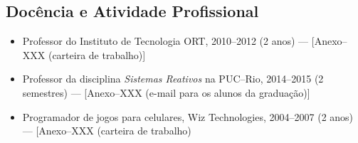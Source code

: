 \documentclass[12pt,a4paper]{article}
\begin{document}
\subsection*{Docência e Atividade Profissional}

\begin{itemize}
\item
Professor do Instituto de Tecnologia ORT, 2010--2012 (2 anos)
--- [Anexo--XXX (carteira de trabalho)]
\item
Professor da disciplina \emph{Sistemas Reativos} na PUC--Rio, 2014--2015 (2 
semestres)
--- [Anexo--XXX (e-mail para os alunos da graduação)]
\item
Programador de jogos para celulares, Wiz Technologies, 2004--2007 (2 anos)
--- [Anexo--XXX (carteira de trabalho)
\end{itemize}

\newpage


\end{document}
